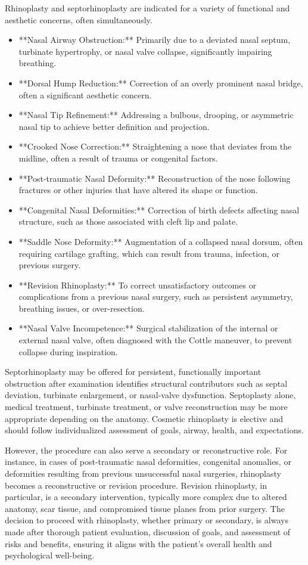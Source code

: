 Rhinoplasty and septorhinoplasty are indicated for a variety of functional and aesthetic concerns, often simultaneously.

\begin{itemize}
  \item **Nasal Airway Obstruction:** Primarily due to a deviated nasal septum, turbinate hypertrophy, or nasal valve collapse, significantly impairing breathing.
  \item **Dorsal Hump Reduction:** Correction of an overly prominent nasal bridge, often a significant aesthetic concern.
  \item **Nasal Tip Refinement:** Addressing a bulbous, drooping, or asymmetric nasal tip to achieve better definition and projection.
  \item **Crooked Nose Correction:** Straightening a nose that deviates from the midline, often a result of trauma or congenital factors.
  \item **Post-traumatic Nasal Deformity:** Reconstruction of the nose following fractures or other injuries that have altered its shape or function.
  \item **Congenital Nasal Deformities:** Correction of birth defects affecting nasal structure, such as those associated with cleft lip and palate.
  \item **Saddle Nose Deformity:** Augmentation of a collapsed nasal dorsum, often requiring cartilage grafting, which can result from trauma, infection, or previous surgery.
  \item **Revision Rhinoplasty:** To correct unsatisfactory outcomes or complications from a previous nasal surgery, such as persistent asymmetry, breathing issues, or over-resection.
  \item **Nasal Valve Incompetence:** Surgical stabilization of the internal or external nasal valve, often diagnosed with the Cottle maneuver, to prevent collapse during inspiration.
\end{itemize}

Septorhinoplasty may be offered for persistent, functionally important obstruction after examination identifies structural contributors such as septal deviation, turbinate enlargement, or nasal-valve dysfunction. Septoplasty alone, medical treatment, turbinate treatment, or valve reconstruction may be more appropriate depending on the anatomy. Cosmetic rhinoplasty is elective and should follow individualized assessment of goals, airway, health, and expectations.

However, the procedure can also serve a secondary or reconstructive role. For instance, in cases of post-traumatic nasal deformities, congenital anomalies, or deformities resulting from previous unsuccessful nasal surgeries, rhinoplasty becomes a reconstructive or revision procedure. Revision rhinoplasty, in particular, is a secondary intervention, typically more complex due to altered anatomy, scar tissue, and compromised tissue planes from prior surgery. The decision to proceed with rhinoplasty, whether primary or secondary, is always made after thorough patient evaluation, discussion of goals, and assessment of risks and benefits, ensuring it aligns with the patient's overall health and psychological well-being.

